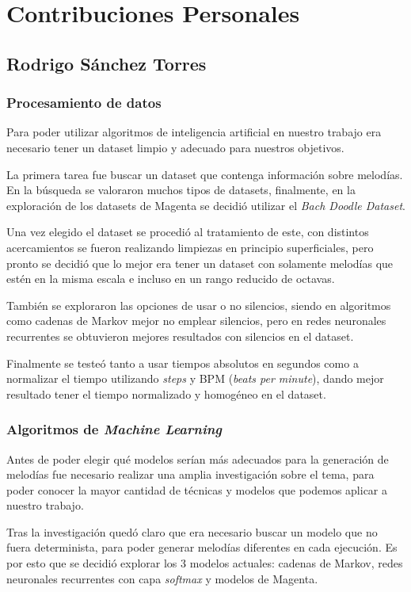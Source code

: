 \chapter*{Contribuciones Personales}
\label{cap:contribucionesPersonales}

\section*{Rodrigo Sánchez Torres}
\subsection*{Procesamiento de datos}
Para poder utilizar algoritmos de inteligencia artificial en nuestro trabajo era necesario tener un dataset limpio y adecuado para nuestros objetivos.

La primera tarea fue buscar un dataset que contenga información sobre melodías. En la búsqueda se valoraron muchos tipos de datasets, finalmente, en la exploración de los datasets de Magenta se decidió utilizar el \textit{Bach Doodle Dataset}.

Una vez elegido el dataset se procedió al tratamiento de este, con distintos acercamientos se fueron realizando limpiezas en principio superficiales, pero pronto se decidió que lo mejor era tener un dataset con solamente melodías que estén en la misma escala e incluso en un rango reducido de octavas. 

También se exploraron las opciones de usar o no silencios, siendo en algoritmos como cadenas de Markov mejor no emplear silencios, pero en redes neuronales recurrentes se obtuvieron mejores resultados con silencios en el dataset.

Finalmente se testeó tanto a usar tiempos absolutos en segundos como a normalizar el tiempo utilizando \textit{steps} y BPM (\textit{beats per minute}), dando mejor resultado tener el tiempo normalizado y homogéneo en el dataset.

\subsection*{Algoritmos de \textit{Machine Learning}}
Antes de poder elegir qué modelos serían más adecuados para la generación de melodías fue necesario realizar una amplia investigación sobre el tema, para poder conocer la mayor cantidad de técnicas y modelos que podemos aplicar a nuestro trabajo.

Tras la investigación quedó claro que era necesario buscar un modelo que no fuera determinista, para poder generar melodías diferentes en cada ejecución. Es por esto que se decidió explorar los 3 modelos actuales: cadenas de Markov, redes neuronales recurrentes con capa \textit{softmax} y modelos de Magenta.

